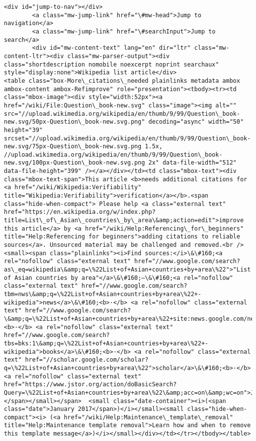 \documentclass[11pt]{article}
\begin{document}
\begin{Verbatim}[commandchars=\\\{\}]
		<div id="jump-to-nav"></div>
		<a class="mw-jump-link" href="\#mw-head">Jump to navigation</a>
		<a class="mw-jump-link" href="\#searchInput">Jump to search</a>
		<div id="mw-content-text" lang="en" dir="ltr" class="mw-content-ltr"><div class="mw-parser-output"><div class="shortdescription nomobile noexcerpt noprint searchaux" style="display:none">Wikipedia list article</div>
<table class="box-More\_citations\_needed plainlinks metadata ambox ambox-content ambox-Refimprove" role="presentation"><tbody><tr><td class="mbox-image"><div style="width:52px"><a href="/wiki/File:Question\_book-new.svg" class="image"><img alt="" src="//upload.wikimedia.org/wikipedia/en/thumb/9/99/Question\_book-new.svg/50px-Question\_book-new.svg.png" decoding="async" width="50" height="39" srcset="//upload.wikimedia.org/wikipedia/en/thumb/9/99/Question\_book-new.svg/75px-Question\_book-new.svg.png 1.5x, //upload.wikimedia.org/wikipedia/en/thumb/9/99/Question\_book-new.svg/100px-Question\_book-new.svg.png 2x" data-file-width="512" data-file-height="399" /></a></div></td><td class="mbox-text"><div class="mbox-text-span">This article <b>needs additional citations for <a href="/wiki/Wikipedia:Verifiability" title="Wikipedia:Verifiability">verification</a></b>.<span class="hide-when-compact"> Please help <a class="external text" href="https://en.wikipedia.org/w/index.php?title=List\_of\_Asian\_countries\_by\_area\&amp;action=edit">improve this article</a> by <a href="/wiki/Help:Referencing\_for\_beginners" title="Help:Referencing for beginners">adding citations to reliable sources</a>. Unsourced material may be challenged and removed.<br /><small><span class="plainlinks"><i>Find sources:</i>\&\#160;<a rel="nofollow" class="external text" href="//www.google.com/search?as\_eq=wikipedia\&amp;q=\%22List+of+Asian+countries+by+area\%22">"List of Asian countries by area"</a>\&\#160;–\&\#160;<a rel="nofollow" class="external text" href="//www.google.com/search?tbm=nws\&amp;q=\%22List+of+Asian+countries+by+area\%22+-wikipedia">news</a>\&\#160;<b>·</b> <a rel="nofollow" class="external text" href="//www.google.com/search?\&amp;q=\%22List+of+Asian+countries+by+area\%22+site:news.google.com/newspapers\&amp;source=newspapers">newspapers</a>\&\#160;<b>·</b> <a rel="nofollow" class="external text" href="//www.google.com/search?tbs=bks:1\&amp;q=\%22List+of+Asian+countries+by+area\%22+-wikipedia">books</a>\&\#160;<b>·</b> <a rel="nofollow" class="external text" href="//scholar.google.com/scholar?q=\%22List+of+Asian+countries+by+area\%22">scholar</a>\&\#160;<b>·</b> <a rel="nofollow" class="external text" href="https://www.jstor.org/action/doBasicSearch?Query=\%22List+of+Asian+countries+by+area\%22\&amp;acc=on\&amp;wc=on">JSTOR</a></span></small></span>  <small class="date-container"><i>(<span class="date">January 2017</span>)</i></small><small class="hide-when-compact"><i> (<a href="/wiki/Help:Maintenance\_template\_removal" title="Help:Maintenance template removal">Learn how and when to remove this template message</a>)</i></small></div></td></tr></tbody></table>

\end{Verbatim}
\end{document}
